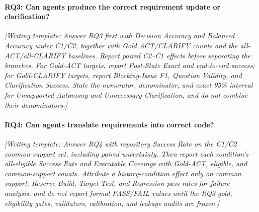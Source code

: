 \documentclass{article} %
\newcommand{\placeholder}[1]{\emph{[#1]}}
\begin{document}
\paragraph{RQ3: Can agents produce the correct requirement update or clarification?}
\placeholder{Writing template: Answer RQ3 first with Decision Accuracy and Balanced Accuracy under C1/C2, together with Gold ACT/CLARIFY counts and the all-ACT/all-CLARIFY baselines. Report paired C2--C1 effects before separating the branches. For Gold-ACT targets, report Post-State Exact and end-to-end success; for Gold-CLARIFY targets, report Blocking-Issue F1, Question Validity, and Clarification Success. State the numerator, denominator, and exact 95\% interval for Unsupported Autonomy and Unnecessary Clarification, and do not combine their denominators.}

\paragraph{RQ4: Can agents translate requirements into correct code?}
\placeholder{Writing template: Answer RQ4 with repository Success Rate on the C1/C2 common-support set, including paired uncertainty. Then report each condition's all-eligible Success Rate and Executable Coverage with Gold-ACT, eligible, and common-support counts. Attribute a history-condition effect only on common support. Reserve Build, Target Test, and Regression pass rates for failure analysis, and do not report formal PASS/FAIL values until the RQ3 gold, eligibility gates, validators, calibration, and leakage audits are frozen.}
\end{document}

